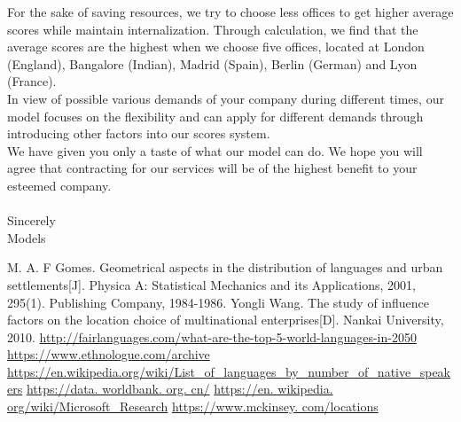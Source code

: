 \documentclass{mcmthesis}
\begin{document}
\indent For the sake of saving resources, we try to choose less offices to get higher average scores while maintain internalization. Through calculation, we find that the average scores are the highest when we choose five offices, located at London (England), Bangalore (Indian), Madrid (Spain), Berlin (German) and Lyon (France).\\
\indent In view of possible various demands of your company during different times, our model focuses on the flexibility and can apply for different demands through introducing other factors into our scores system.\\
\indent We have given you only a taste of what our model can do. We hope you will agree that contracting for our services will be of the highest benefit to your esteemed company.\\\\
Sincerely\\
Models

\newpage
\begin{thebibliography}{99}
M. A. F Gomes. Geometrical aspects in the distribution of languages and urban settlements[J]. Physica A:  Statistical Mechanics and its Applications, 2001, 295(1). Publishing Company, 1984-1986.
Yongli Wang. The study of influence factors on the location choice of multinational enterprises[D]. Nankai University, 2010.
\url{http://fairlanguages.com/what-are-the-top-5-world-languages-in-2050}
\url{https://www.ethnologue.com/archive}
\url{https://en.wikipedia.org/wiki/List_of_languages_by_number_of_native_speakers}
\url{https://data. worldbank. org. cn/}
\url{https://en. wikipedia. org/wiki/Microsoft_Research}
\url{https://www.mckinsey. com/locations}
\end{thebibliography}
\end{document}

